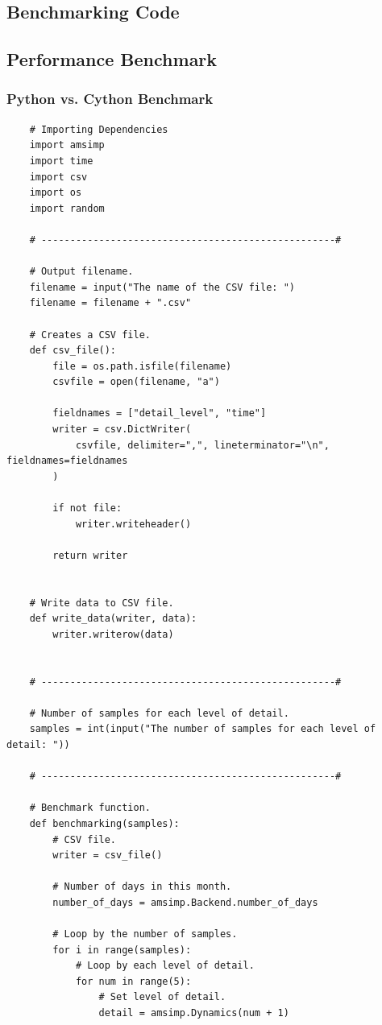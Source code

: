 \begin{appendices}
    \section{Benchmarking Code}\label{code}
    \subsection{Performance Benchmark}
    \subsubsection{Python vs. Cython Benchmark}
    \begin{verbatim}
    # Importing Dependencies
    import amsimp
    import time
    import csv
    import os
    import random
    
    # ---------------------------------------------------#
    
    # Output filename.
    filename = input("The name of the CSV file: ")
    filename = filename + ".csv"
    
    # Creates a CSV file.
    def csv_file():
        file = os.path.isfile(filename)
        csvfile = open(filename, "a")
    
        fieldnames = ["detail_level", "time"]
        writer = csv.DictWriter(
            csvfile, delimiter=",", lineterminator="\n", fieldnames=fieldnames
        )
    
        if not file:
            writer.writeheader()
    
        return writer
    
    
    # Write data to CSV file.
    def write_data(writer, data):
        writer.writerow(data)
    
    
    # ---------------------------------------------------#
    
    # Number of samples for each level of detail.
    samples = int(input("The number of samples for each level of detail: "))
    
    # ---------------------------------------------------#
    
    # Benchmark function.
    def benchmarking(samples):
        # CSV file.
        writer = csv_file()
    
        # Number of days in this month.
        number_of_days = amsimp.Backend.number_of_days
    
        # Loop by the number of samples.
        for i in range(samples):
            # Loop by each level of detail.
            for num in range(5):
                # Set level of detail.
                detail = amsimp.Dynamics(num + 1)
    

\end{verbatim}
\end{appendices}
